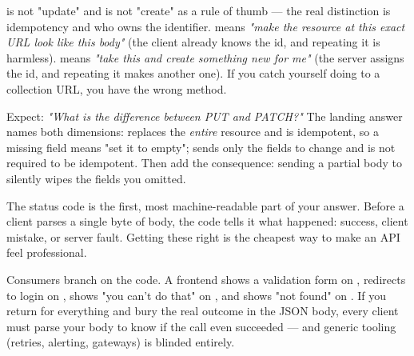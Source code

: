 \begin{misconception}
 is not "update" and  is not "create" as a rule of thumb --- the real distinction is idempotency and who owns the identifier.  means \emph{"make the resource at this exact URL look like this body"} (the client already knows the id, and repeating it is harmless).  means \emph{"take this and create something new for me"} (the server assigns the id, and repeating it makes another one). If you catch yourself doing  to a collection URL, you have the wrong method.
\end{misconception}

\begin{interview}
Expect: \emph{"What is the difference between PUT and PATCH?"} The landing answer names both dimensions:  replaces the \emph{entire} resource and is idempotent, so a missing field means "set it to empty";  sends only the fields to change and is not required to be idempotent. Then add the consequence: sending a partial body to  silently wipes the fields you omitted.
\end{interview}


 The status code is the first, most machine-readable part of your answer. Before a client parses a single byte of body, the code tells it what happened: success, client mistake, or server fault. Getting these right is the cheapest way to make an API feel professional.

 Consumers branch on the code. A frontend shows a validation form on , redirects to login on , shows "you can't do that" on , and shows "not found" on . If you return  for everything and bury the real outcome in the JSON body, every client must parse your body to know if the call even succeeded --- and generic tooling (retries, alerting, gateways) is blinded entirely.

